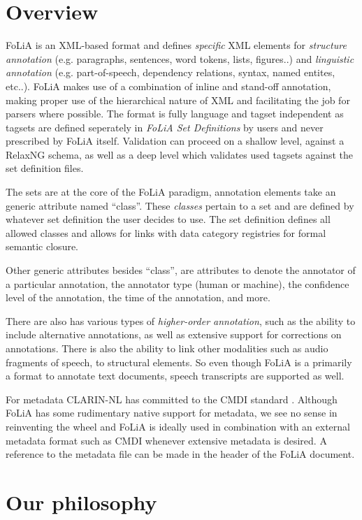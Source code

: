 \documentclass[a4paper,10pt,twoside]{article}
\begin{document}
\section{Overview}
\label{sec:overview}

FoLiA is an XML-based format and defines \emph{specific} XML elements for \emph{structure
annotation} (e.g. paragraphs, sentences, word tokens, lists, figures..) and
\emph{linguistic annotation} (e.g. part-of-speech, dependency relations,
syntax, named entites, etc..). FoLiA makes use of a combination of inline and
stand-off annotation, making proper use of the hierarchical nature of XML and
facilitating the job for parsers where possible. The format is fully language and
tagset independent as tagsets are defined seperately in \emph{FoLiA Set Definitions}
by users and never prescribed by FoLiA itself. Validation can proceed
on a shallow level, against a RelaxNG schema, as well as a deep level which
validates used tagsets against the set definition files.

The sets are at the core of the FoLiA paradigm, annotation elements take an
generic attribute named ``class''. These \emph{classes} pertain to a set and are
defined by whatever set definition the user decides to use. The set definition
defines all allowed classes and allows for links with data category registries
for formal semantic closure.

Other generic attributes besides ``class'', are attributes to denote the
annotator of a particular annotation, the annotator type (human or machine),
the confidence level of the annotation, the time of the annotation, and more.

There are also has various types of \emph{higher-order annotation}, such as
the ability to include alternative annotations, as well as extensive support
for corrections on annotations. There is also the ability to link other
modalities such as audio fragments of speech, to structural elements. So even
though FoLiA is a primarily a format to annotate text documents, speech
transcripts are supported as well. 

For metadata CLARIN-NL has committed to the CMDI standard \cite{CMDI}.
Although FoLiA has some rudimentary native support for metadata, we see no
sense in reinventing the wheel and FoLiA is ideally used in combination with an
external metadata format such as CMDI whenever extensive metadata is desired. A
reference to the metadata file can be made in the header of the FoLiA document.

\section{Our philosophy}
\end{document}
